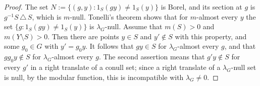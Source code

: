 \documentclass[11pt]{amsart}
\theoremstyle{definition}
\begin{document}
\begin{itemize}
\begin{proof}
The set $N:=\{(g,y):1_S(gy)\ne1_S(y)\}$ is Borel, and its section at $g$ is $g^{-1}S\,\triangle\,S$, which is $m$-null.
Tonelli's theorem shows that for $m$-almost every $y$ the set $\{g:1_S(gy)\ne1_S(y)\}$ is $\lambda_G$-null.
Assume that $m(S)>0$ and $m(Y\setminus S)>0$.
Then there are points $y\in S$ and $y'\notin S$ with this property, and some $g_0\in G$ with $y'=g_0y$.
It follows that $gy\in S$ for $\lambda_G$-almost every $g$, and that $gg_0y\notin S$ for $\lambda_G$-almost every $g$.
The second assertion means that $g'y\notin S$ for every $g'$ in a right translate of a conull set;
since a right translate of a $\lambda_G$-null set is null, by the modular function, this is incompatible with $\lambda_G\ne0$.
\end{proof}
\end{itemize}
\end{document}
